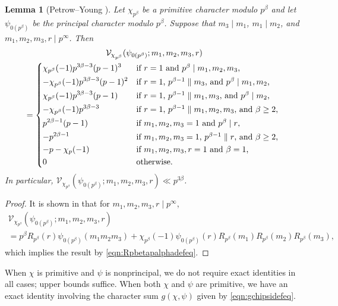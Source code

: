 \documentclass[11pt,a4paper]{amsart}
\newcommand{\VV}{\mathcal{V}}
\numberwithin{equation}{section}
\newtheorem{lemma}[equation]{Lemma}
\theoremstyle{remark}
\theoremstyle{definition}
\begin{document}
\begin{lemma}[Petrow--Young {\cite{PY20}}]
\label{lem:VVchiprimprinc}
Let $\chi_{p^{\beta}}$ be a primitive character modulo $p^{\beta}$ and let $\psi_{0(p^{\beta})}$ be the principal character modulo $p^{\beta}$. Suppose that $m_3 \mid m_1$, $m_1 \mid m_2$, and $m_1,m_2,m_3,r \mid p^{\infty}$. Then
\begin{multline*}
\VV_{\chi_{p^{\beta}}}(\psi_{0(p^{\beta})}; m_1,m_2,m_3,r)	\\
= \begin{dcases*}
\chi_{p^{\beta}}(-1) p^{3\beta - 3} (p - 1)^3 & if $r = 1$ and $p^{\beta} \mid m_1,m_2,m_3$,	\\
-\chi_{p^{\beta}}(-1) p^{3\beta - 3} (p - 1)^2 & if $r = 1$, $p^{\beta - 1} \parallel m_3$, and $p^{\beta} \mid m_1,m_2$,	\\
\chi_{p^{\beta}}(-1) p^{3\beta - 3} (p - 1) & if $r = 1$, $p^{\beta - 1} \parallel m_1,m_3$, and $p^{\beta} \mid m_2$,	\\
-\chi_{p^{\beta}}(-1) p^{3\beta - 3} & if $r = 1$, $p^{\beta - 1} \parallel m_1,m_2,m_3$, and $\beta \geq 2$,	\\
p^{2\beta - 1}(p - 1) & if $m_1, m_2, m_3 = 1$ and $p^{\beta} \mid r$,	\\
-p^{2\beta - 1} & if $m_1, m_2, m_3 = 1$, $p^{\beta - 1} \parallel r$, and $\beta \geq 2$,	\\
-p - \chi_p(-1) & if $m_1, m_2, m_3, r = 1$ and $\beta = 1$,	\\
0 & otherwise.
\end{dcases*}
\end{multline*}
In particular, $\VV_{\chi_{p^{\beta}}}(\psi_{0(p^{\beta})}; m_1,m_2,m_3,r) \ll p^{3\beta}$.
\end{lemma}

\begin{proof}
It is shown in \cite[Lemma 6.5]{PY20} that for $m_1,m_2,m_3,r \mid p^{\infty}$,
\begin{multline*}
\VV_{\chi_{p^{\beta}}}(\psi_{0(p^{\beta})}; m_1,m_2,m_3,r)	\\
= p^{\beta} R_{p^{\beta}}(r) \psi_{0(p^{\beta})}(m_1 m_2 m_3) + \chi_{p^{\beta}}(-1) \psi_{0(p^{\beta})}(r) R_{p^{\beta}}(m_1) R_{p^{\beta}}(m_2) R_{p^{\beta}}(m_3),
\end{multline*}
which implies the result by \eqref{eqn:Rpbetapalphadefeq}.
\end{proof}

When $\chi$ is primitive and $\psi$ is nonprincipal, we do not require exact identities in all cases; upper bounds suffice. When both $\chi$ and $\psi$ are primitive, we have an exact identity involving the character sum $g(\chi,\psi)$ given by \eqref{eqn:gchipsidefeq}.
\end{document}

